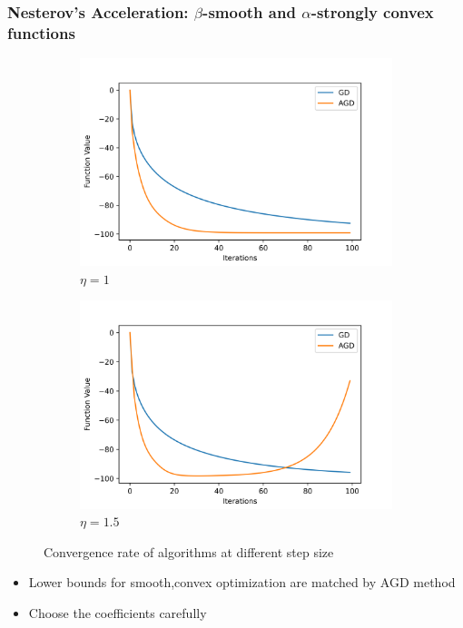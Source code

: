 \begin{frame}
\frametitle{ Nesterov’s Acceleration: $\beta$-smooth and $\alpha$-strongly convex functions}
    \begin{figure}[h!]
    \centering
    \begin{subfigure}{0.49\textwidth}
        \includegraphics[width=\textwidth]{./figures/fig_r1.png}
        \caption{$\eta = 1$}
        \label{fig:first}
    \end{subfigure}
    \hfill
    \begin{subfigure}{0.49\textwidth}
        \includegraphics[width=\textwidth]{./figures/fig_r2.png}
        \caption{$\eta = 1.5$}
        \label{fig:second}
    \end{subfigure}
    \caption{Convergence rate of algorithms at different step size}
    \label{fig:figures}    
    \end{figure}

    \begin{itemize}
        \item Lower bounds for smooth,convex optimization are matched by AGD method

        \item Choose the coefficients carefully
    \end{itemize}
\end{frame}

